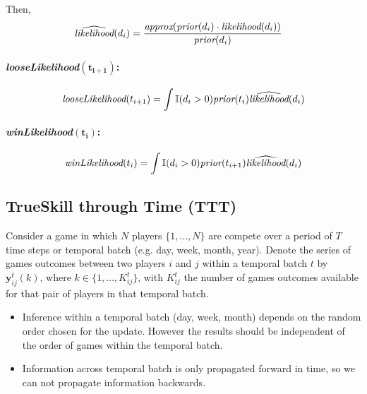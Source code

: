 \documentclass[article]{jss}
\newcommand{\vm}[1]{\mathbf{#1}}
\begin{document}
Then,
\begin{equation}
\begin{split}
\widehat{\emph{likelihood}}(d_i) &= \frac{\emph{approx}(\emph{prior}(d_i) \cdot \emph{likelihood}(d_i))}{ \emph{prior}(d_i)}
\end{split}
\end{equation}

\paragraph{\emph{looseLikelihood}$\bm{(t_{i+1})}$:}

\begin{equation}
 \begin{split}
  \emph{looseLikelihood}(t_{i+1}) = \int \mathbb{I}(d_i>0) \emph{prior}(t_i) \widehat{\emph{likelihood}}(d_i)
 \end{split}
\end{equation}


\paragraph{\emph{winLikelihood}$\bm{(t_{i})}$:}
\begin{equation}
 \begin{split}
  \emph{winLikelihood}(t_{i}) = \int \mathbb{I}(d_i>0) \emph{prior}(t_{i+1}) \widehat{\emph{likelihood}}(d_i)
 \end{split}
\end{equation}




\subsection{TrueSkill through Time (TTT)}


Consider a game in which $N$ players $\{1, \dots, N\}$ are compete over a period of $T$ time steps or temporal batch (e.g. day, week, month, year).
Denote the series of games outcomes between two players $i$ and $j$ within a temporal batch $t$ by $\vm{y}^t_{ij}(k)$, where $k \in \{1,\dots,K^t_{ij}\}$, with $K^t_{ij}$ the number of games outcomes available for that pair of players in that temporal batch.


\begin{itemize}
 \item Inference within a temporal batch (day, week, month) depends on the random order chosen for the update. However the results should be independent of the order of games within the temporal batch.
 \item Information across temporal batch is only propagated forward in time, so we can not propagate information backwards.
\end{itemize}
\end{document}
